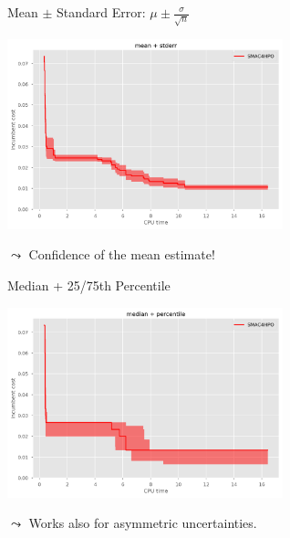 \begin{frame}[c]{Mean $\pm$ Standard Error: $\mu \pm \frac{\sigma}{\sqrt{n}}$}
	
	\centering
	\includegraphics[width=0.6\textwidth]{plots/cpu_time/8_2_smac4hpo_mean_stderr.png}
	
	\pause
	$\leadsto$ Confidence of the mean estimate!
	
\end{frame}


\begin{frame}[c]{Median + 25/75th Percentile}
		
		\centering
		\includegraphics[width=0.6\textwidth]{plots/cpu_time/8_3_smac4hpo_median_percentile.png}
		
		\pause
		$\leadsto$ Works also for asymmetric uncertainties.
		
\end{frame}
	


